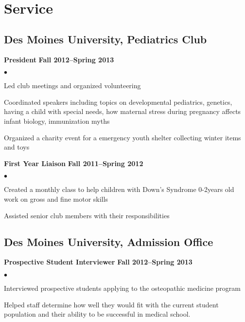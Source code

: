 \documentclass[10pt,letterpaper]{article}
\renewenvironment{itemize}{
  \begin{list}{}{
      \setlength{\leftmargin}{1.5em}
      \setlength{\itemsep}{0.25em}
      \setlength{\parskip}{0pt}
      \setlength{\parsep}{0.25em}
    }
  }{
  \end{list}
}
\newenvironment{bitemize}{
  \begin{list}{$\bullet$}{
      \setlength{\leftmargin}{1.5em}
      \setlength{\itemsep}{0.25em}
      \setlength{\parskip}{0pt}
      \setlength{\parsep}{0.25em}
    }
  }{
  \end{list}
}
\newcommand{\yearrange}[1]{\hfill \textbf{#1} \par}
\begin{document}
\section*{Service}
\subsection*{Des Moines University, Pediatrics Club}
\begin{itemize}
\item \textbf{President} \yearrange{Fall 2012--Spring 2013}
  \begin{bitemize}
  \item Led club meetings and organized volunteering
  \item Coordinated speakers including topics on developmental
    pediatrics, genetics, having a child with special needs, how
    maternal stress during pregnancy affects infant biology,
    immunization myths
  \item Organized a charity event for a emergency youth shelter
    collecting winter items and toys
  \end{bitemize}
\item \textbf{First Year Liaison} \yearrange{Fall 2011--Spring 2012}
  \begin{bitemize}
  \item Created a monthly class to help children with Down's Syndrome 
    0-2years old work on gross and fine motor skills
  \item Assisted senior club members with their responsibilities
  \end{bitemize}
\end{itemize}

\subsection*{Des Moines University, Admission Office}
\begin{itemize}
\item \textbf{Prospective Student Interviewer} \yearrange{Fall 2012--Spring 2013}
  \begin{bitemize}
  \item Interviewed prospective students applying to the osteopathic
    medicine program 
   \item Helped staff determine how well they would fit
    with the current student population and their ability to be
    successful in medical school.
  \end{bitemize}
\end{itemize}
\end{document}
